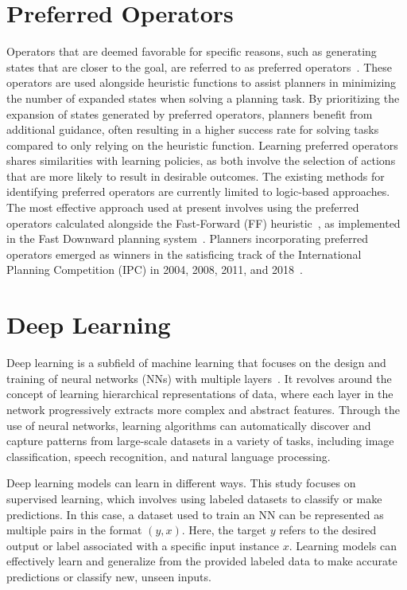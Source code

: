 \documentclass[ppgc,diss,english]{iiufrgs}
\begin{document}
\section{Preferred Operators}
\label{sec:intro-preferred-ops}
Operators that are deemed favorable for specific reasons, such as generating states that are closer to the goal, are referred to as preferred operators~\cite{Helmert/2006,Richter.Helmert/2009}. These operators are used alongside heuristic functions to assist planners in minimizing the number of expanded states when solving a planning task.
By prioritizing the expansion of states generated by preferred operators, planners benefit from additional guidance, often resulting in a higher success rate for solving tasks compared to only relying on the heuristic function. Learning preferred operators shares similarities with learning policies, as both involve the selection of actions that are more likely to result in desirable outcomes. The existing methods for identifying preferred operators are currently limited to logic-based approaches. The most effective approach used at present involves using the preferred operators calculated alongside the Fast-Forward (FF) heuristic~\cite{Hoffmann.Nebel/2001}, as implemented in the Fast Downward planning system~\cite{Helmert/2006}. Planners incorporating preferred operators emerged as winners in the satisficing track of the International Planning Competition (IPC) in 2004, 2008, 2011, and 2018~\cite{Helmert/2006,Richter.lama.etal/2011,Richter.lama.etal/2011,Seipp-fast.etal/2018}.

\section{Deep Learning}
\label{sec:intro-deep-learning}
Deep learning is a subfield of machine learning that focuses on the design and training of neural networks (NNs) with multiple layers~\cite{Goodfellow.etal/2016}. It revolves around the concept of learning hierarchical representations of data, where each layer in the network progressively extracts more complex and abstract features. Through the use of neural networks, learning algorithms can automatically discover and capture patterns from large-scale datasets in a variety of tasks, including image classification, speech recognition, and natural language processing.

Deep learning models can learn in different ways. This study focuses on supervised learning, which involves using labeled datasets to classify or make predictions. In this case, a dataset used to train an NN can be represented as multiple pairs in the format $(y, x)$. Here, the target $y$ refers to the desired output or label associated with a specific input instance $x$. Learning models can effectively learn and generalize from the provided labeled data to make accurate predictions or classify new, unseen inputs.
\end{document}
